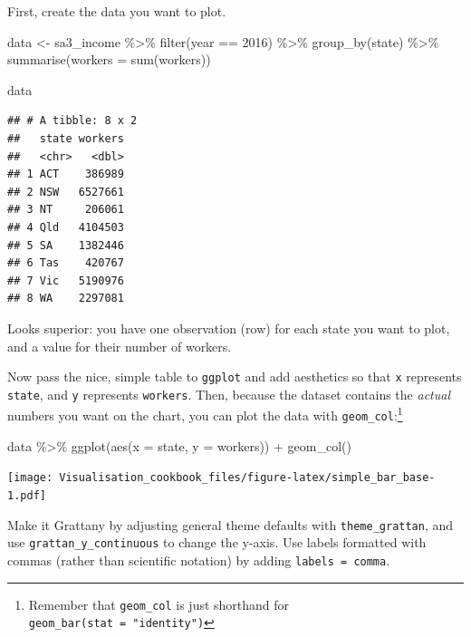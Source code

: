 \documentclass[
]{book}
\newenvironment{Shaded}{\begin{snugshade}}{\end{snugshade}}
\newcommand{\AttributeTok}[1]{\textcolor[rgb]{0.77,0.63,0.00}{#1}}
\newcommand{\DecValTok}[1]{\textcolor[rgb]{0.00,0.00,0.81}{#1}}
\newcommand{\FunctionTok}[1]{\textcolor[rgb]{0.00,0.00,0.00}{#1}}
\newcommand{\NormalTok}[1]{#1}
\newcommand{\OtherTok}[1]{\textcolor[rgb]{0.56,0.35,0.01}{#1}}
\newcommand{\SpecialCharTok}[1]{\textcolor[rgb]{0.00,0.00,0.00}{#1}}
\begin{document}
First, create the data you want to plot.

\begin{Shaded}
\begin{Highlighting}[]
\NormalTok{data }\OtherTok{\textless{}{-}}\NormalTok{ sa3\_income }\SpecialCharTok{\%\textgreater{}\%} 
  \FunctionTok{filter}\NormalTok{(year }\SpecialCharTok{==} \DecValTok{2016}\NormalTok{) }\SpecialCharTok{\%\textgreater{}\%} 
  \FunctionTok{group\_by}\NormalTok{(state) }\SpecialCharTok{\%\textgreater{}\%} 
  \FunctionTok{summarise}\NormalTok{(}\AttributeTok{workers =} \FunctionTok{sum}\NormalTok{(workers))}

\NormalTok{data}
\end{Highlighting}
\end{Shaded}

\begin{verbatim}
## # A tibble: 8 x 2
##   state workers
##   <chr>   <dbl>
## 1 ACT    386989
## 2 NSW   6527661
## 3 NT     206061
## 4 Qld   4104503
## 5 SA    1382446
## 6 Tas    420767
## 7 Vic   5190976
## 8 WA    2297081
\end{verbatim}

Looks superior: you have one observation (row) for each state you want to plot, and a value for their number of workers.

Now pass the nice, simple table to \texttt{ggplot} and add aesthetics so that \texttt{x} represents \texttt{state}, and \texttt{y} represents \texttt{workers}. Then, because the dataset contains the \emph{actual} numbers you want on the chart, you can plot the data with \texttt{geom\_col}:\footnote{Remember that \texttt{geom\_col} is just shorthand for \texttt{geom\_bar(stat\ =\ "identity")}}

\begin{Shaded}
\begin{Highlighting}[]
\NormalTok{data }\SpecialCharTok{\%\textgreater{}\%} 
  \FunctionTok{ggplot}\NormalTok{(}\FunctionTok{aes}\NormalTok{(}\AttributeTok{x =}\NormalTok{ state,}
             \AttributeTok{y =}\NormalTok{ workers)) }\SpecialCharTok{+} 
  \FunctionTok{geom\_col}\NormalTok{()}
\end{Highlighting}
\end{Shaded}

\texttt{[image: Visualisation\_cookbook\_files/figure-latex/simple\_bar\_base-1.pdf]}

Make it Grattany by adjusting general theme defaults with \texttt{theme\_grattan}, and use \texttt{grattan\_y\_continuous} to change the y-axis. Use labels formatted with commas (rather than scientific notation) by adding \texttt{labels\ =\ comma}.
\end{document}
